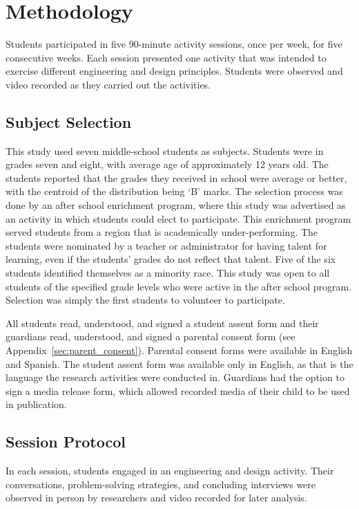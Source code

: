 \chapter{Methodology}

Students participated in five 90-minute activity sessions, once per week, for five consecutive weeks. Each session presented one activity that was intended to exercise different engineering and design principles. Students were observed and video recorded as they carried out the activities. 

\section{Subject Selection} 

This study used seven middle-school students as subjects. Students were in grades seven and eight, with average age of approximately 12 years old. The students reported that the grades they received in school were average or better, with the centroid of the distribution being `B' marks. The selection process was done by an after school enrichment program, where this study was advertised as an activity in which students could elect to participate.  This enrichment program served students from a region that is academically under-performing.  The students were nominated by a teacher or administrator for having talent for learning, even if the students' grades do not reflect that talent. Five of the six students identified themselves as a minority race. This study was open to all students of the specified grade levels who were active in the after school program. Selection was simply the first students to volunteer to participate.

All students read, understood, and signed a student assent form and their guardians read, understood, and signed a parental consent form (see Appendix~\ref{sec:parent_consent}). Parental consent forms were available in English and Spanish. The student assent form was available only in English, as that is the language the research activities were conducted in. Guardians had the option to sign a media release form, which allowed recorded media of their child to be used in publication. 

\section{Session Protocol}

In each session, students engaged in an engineering and design activity. Their conversations, problem-solving strategies, and concluding interviews were observed in person by researchers and video recorded for later analysis.

